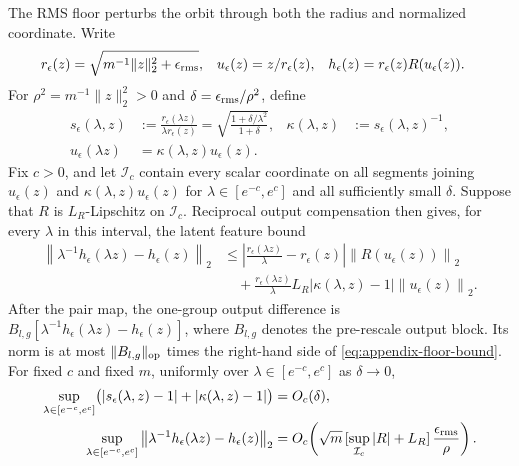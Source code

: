 \documentclass{article}
\begin{document}
The RMS floor perturbs the orbit through both the radius and normalized
coordinate.  Write
\begin{equation}
\begin{aligned}
    r_\epsilon(z)
    &=\sqrt{m^{-1}\lVert z\rVert_2^2+\epsilon_{\rm rms}},
    &
    u_\epsilon(z)
    &=z/r_\epsilon(z),
    &
    h_\epsilon(z)
    &=r_\epsilon(z)R(u_\epsilon(z)).
\end{aligned}
\end{equation}
For $\rho^2=m^{-1}\lVert z\rVert_2^2>0$ and
$\delta=\epsilon_{\rm rms}/\rho^2$, define
\begin{equation}
\begin{aligned}
    s_\epsilon(\lambda,z)
    &:=
    \frac{r_\epsilon(\lambda z)}{\lambda r_\epsilon(z)}
    =
    \sqrt{\frac{1+\delta/\lambda^2}{1+\delta}},
    &
    \kappa(\lambda,z)
    &:=
    s_\epsilon(\lambda,z)^{-1},
    \\
    u_\epsilon(\lambda z)
    &=\kappa(\lambda,z)u_\epsilon(z).
\end{aligned}
    \label{eq:appendix-kappa}
\end{equation}
Fix $c>0$, and let $\mathcal I_c$ contain every scalar coordinate on all
segments joining $u_\epsilon(z)$ and
$\kappa(\lambda,z)u_\epsilon(z)$ for
$\lambda\in[e^{-c},e^c]$ and all sufficiently small $\delta$.  Suppose that
$R$ is $L_R$-Lipschitz on $\mathcal I_c$.  Reciprocal output compensation then
gives, for every $\lambda$ in this interval, the latent feature bound
\begin{equation}
\begin{aligned}
    \left\|\lambda^{-1}h_\epsilon(\lambda z)-h_\epsilon(z)\right\|_2
    &\le
    \left|\frac{r_\epsilon(\lambda z)}{\lambda}-r_\epsilon(z)\right|
    \left\|R(u_\epsilon(z))\right\|_2
    \\
    &\quad+
    \frac{r_\epsilon(\lambda z)}{\lambda}
    L_R|\kappa(\lambda,z)-1|\left\|u_\epsilon(z)\right\|_2 .
\end{aligned}
    \label{eq:appendix-floor-bound}
\end{equation}
After the pair map, the one-group output difference is
$B_{l,g}[\lambda^{-1}h_\epsilon(\lambda z)-h_\epsilon(z)]$, where
$B_{l,g}$ denotes the pre-rescale output block.  Its norm is at most
$\lVert B_{l,g}\rVert_{\rm op}$ times the right-hand side of
\eqref{eq:appendix-floor-bound}.  For fixed $c$ and fixed $m$, uniformly over
$\lambda\in[e^{-c},e^c]$ as $\delta\to0$,
\begin{equation}
\begin{aligned}
    \sup_{\lambda\in[e^{-c},e^c]}
    \bigl(|s_\epsilon(\lambda,z)-1|+|\kappa(\lambda,z)-1|\bigr)
    &=O_c(\delta),
    \\
    \sup_{\lambda\in[e^{-c},e^c]}
    \left\|\lambda^{-1}h_\epsilon(\lambda z)-h_\epsilon(z)\right\|_2
    &=
    O_c\!\left(
    \sqrt m\,[\sup_{\mathcal I_c}|R|+L_R]\,
    \frac{\epsilon_{\rm rms}}{\rho}
    \right).
\end{aligned}
\end{equation}
\end{document}
